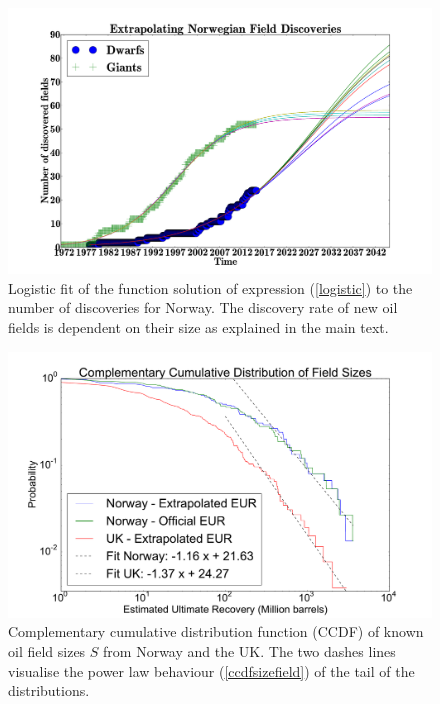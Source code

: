 \documentclass[review]{elsarticle}
\begin{document}
\begin{figure}[H]
\includegraphics[width=1\columnwidth]{extrapolating-no-discoveries}
\caption{Logistic fit of the function solution of expression (\ref{logistic})
to the number of discoveries for Norway. The discovery
rate of new oil fields is dependent on their size as explained in the main text.}
\label{rate_of_discovery} 
\end{figure}

\pagebreak

\begin{figure}[H]
\includegraphics[width=1\columnwidth]{ccdf-field-size}
\caption{Complementary 
cumulative distribution function (CCDF) of known oil field sizes $S$ from Norway and the UK.
The two dashes lines visualise the power law behaviour (\ref{ccdfsizefield}) of the tail
of the distributions. }
\label{ccdffieldsizes}
\end{figure}

\pagebreak
\end{document}
